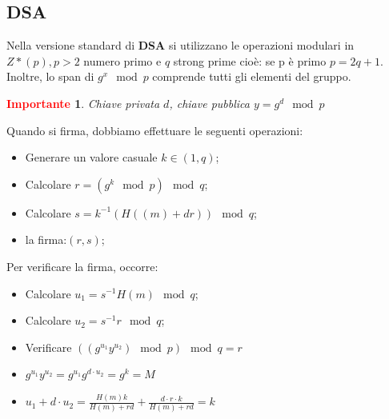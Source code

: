\documentclass{book}
\newtheorem*{Importante}{\textbf{\textcolor{red}{Importante}}}
\begin{document}
\subsection{DSA}
Nella versione standard di \textbf{DSA} si utilizzano le operazioni modulari in \(Z*(p),p>2\) numero primo e \(q\) strong prime cioè: se p è primo \(p=2q+1\). Inoltre, lo span di \(g^{x}\mod{p}\) comprende tutti gli elementi del gruppo.
\begin{Importante}
	Chiave privata \(d\), chiave pubblica \(y=g^{d}\mod{p}\)
\end{Importante}
Quando si firma, dobbiamo effettuare le seguenti operazioni:\begin{itemize}
	\item Generare un valore casuale \(k\in (1,q)\);
	\item Calcolare \(r=(g^{k}\mod{p})\mod{q}\);
	\item Calcolare \(s=k^{-1}(H((m)+dr))\mod{q}\);
	\item la firma:\((r,s)\);
\end{itemize}
Per verificare la firma, occorre:\begin{itemize}
	\item Calcolare \(u_{1}=s^{-1}H(m)\mod{q}\);
	\item Calcolare \(u_{2}=s^{-1}r\mod{q}\);
	\item Verificare \(((g^{u_{1}}y^{u_{2}})\mod{p})\mod{q}= r\)
	\item \(g^{u_{1}}y^{u_{2}}=g^{u_{1}}g^{d\cdot u_{2}}=g^{k}=M\)
	\item \(u_{1}+d\cdot u_{2}=\frac{H(m)k}{H(m)+rd}+\frac{d\cdot r\cdot k}{H(m)+rd}=k\)
\end{itemize}
\end{document}
